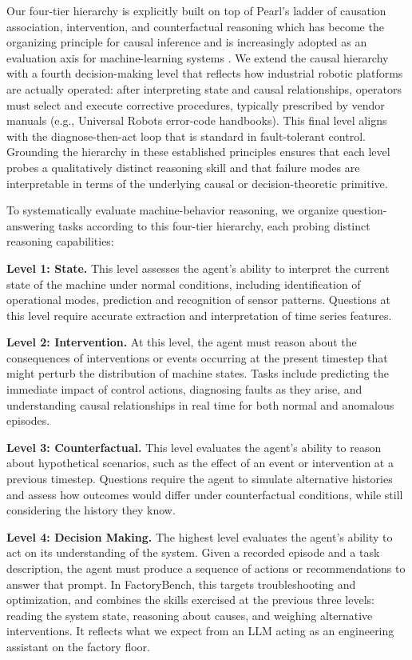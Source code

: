 Our four-tier hierarchy is explicitly built on top of Pearl's ladder of causation association, intervention, and counterfactual reasoning which has become the organizing principle for causal inference and is increasingly adopted as an evaluation axis for machine-learning systems \cite{pearl2009causality,peters2017elements,jin2023cladder,pawlowski2020deep_scm,peyrard2020ladder}. We extend the causal hierarchy with a fourth decision-making level that reflects how industrial robotic platforms are actually operated: after interpreting state and causal relationships, operators must select and execute corrective procedures, typically prescribed by vendor manuals (e.g., Universal Robots error-code handbooks). This final level aligns with the diagnose-then-act loop that is standard in fault-tolerant control. Grounding the hierarchy in these established principles ensures that each level probes a qualitatively distinct reasoning skill and that failure modes are interpretable in terms of the underlying causal or decision-theoretic primitive.

To systematically evaluate machine-behavior reasoning, we organize question-answering tasks according to this four-tier hierarchy, each probing distinct reasoning capabilities:

\textbf{Level 1: State.} This level assesses the agent's ability to interpret the current state of the machine under normal conditions, including identification of operational modes, prediction and recognition of sensor patterns. Questions at this level require accurate extraction and interpretation of time series features.

\textbf{Level 2: Intervention.} At this level, the agent must reason about the consequences of interventions or events occurring at the present timestep that might perturb the distribution of machine states. Tasks include predicting the immediate impact of control actions, diagnosing faults as they arise, and understanding causal relationships in real time for both normal and anomalous episodes.

\textbf{Level 3: Counterfactual.} This level evaluates the agent's ability to reason about hypothetical scenarios, such as the effect of an event or intervention at a previous timestep. Questions require the agent to simulate alternative histories and assess how outcomes would differ under counterfactual conditions, while still considering the history they know.

\textbf{Level 4: Decision Making.} The highest level evaluates the agent's ability to act on its understanding of the system. Given a recorded episode and a task description, the agent must produce a sequence of actions or recommendations to answer that prompt. In FactoryBench, this targets troubleshooting and optimization, and combines the skills exercised at the previous three levels: reading the system state, reasoning about causes, and weighing alternative interventions. It reflects what we expect from an LLM acting as an engineering assistant on the factory floor.

